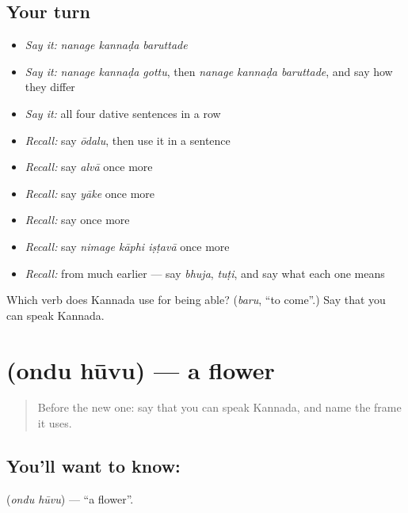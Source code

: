 \subsection*{Your turn}
\begin{itemize}
\raggedright
  \item \emph{Say it:} \emph{nanage kannaḍa baruttade}
  \item \emph{Say it:} \emph{nanage kannaḍa gottu}, then \emph{nanage kannaḍa baruttade}, and say how they differ
  \item \emph{Say it:} all four dative sentences in a row
  \item \emph{Recall:} say \emph{ōdalu}, then use it in a sentence
  \item \emph{Recall:} say \emph{alvā} once more
  \item \emph{Recall:} say \emph{yāke} once more
  \item \emph{Recall:} say \emph{} once more
  \item \emph{Recall:} say \emph{nimage kāphi iṣṭavā} once more
  \item \emph{Recall:} from much earlier — say \emph{bhuja}, \emph{tuṭi}, and say what each one means
\end{itemize}

\begin{tcolorbox}[breakable,colback=teal!4,colframe=teal!35!black,title={Before you move on}]
Which verb does Kannada use for being able? (\emph{baru}, \textquotedblleft{}to come\textquotedblright{}.) Say that you can speak Kannada.
\end{tcolorbox}
\section[\texorpdfstring{\kn{ಒಂದು} \kn{ಹೂವು} (ondu hūvu)}{ಒಂದು ಹೂವು (ondu hūvu)}]{  (ondu hūvu) — a flower}

\label{lesson:KA-C73-a-flower}



\begin{quote}
Before the new one: say that you can speak Kannada, and name the frame it uses.
\end{quote}

\subsection*{You'll want to know:  }
\textbf{ } (\emph{ondu hūvu}) — \textquotedblleft{}a flower\textquotedblright{}.

